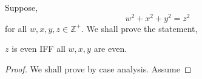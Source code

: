 \begin{pr}
\begin{enumerate}[label=\textbf{(\alph*)}]
        Suppose,
        \begin{equation*}
            w^2 + x^2 + y^2 = z^2
        \end{equation*}
        for all $w,x,y,z \in \mathbb{Z}^{+}$.
        We shall prove the statement,
        \begin{theoPr}
            $z$ is even IFF all $w,x,y$ are even.
        \end{theoPr}
        \begin{proof}
            We shall prove by case analysis. Assume 
        \end{proof}
    \end{enumerate}
\end{pr}